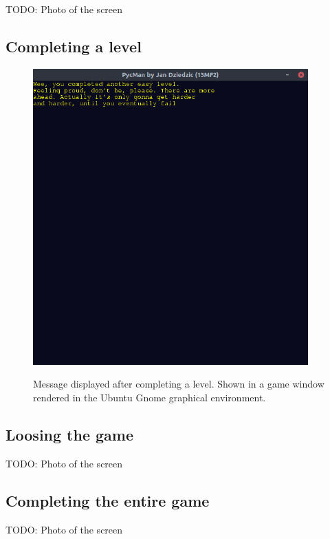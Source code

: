 \documentclass[11pt,a4paper]{report}
\newcommand{\dsubsection}[1]{\FloatBarrier \subsection{#1}}
\newenvironment{img}{
	\begin{center}
		\begin{figure}[H]
			\begin{center}
			
}{
	\end{center}
		\end{figure}
			\end{center}
}
\begin{document}
				TODO: Photo of the screen
			\dsubsection{Completing a level}
				\begin{img}
						\includegraphics[width=300pt]{images/level-complete.png}\\
						\caption{Message displayed after completing a level. Shown in a game window rendered in the Ubuntu Gnome graphical environment.}
				\end{img}
			\dsubsection{Loosing the game}
				TODO: Photo of the screen
			\dsubsection{Completing the entire game}
				TODO: Photo of the screen
\end{document}
